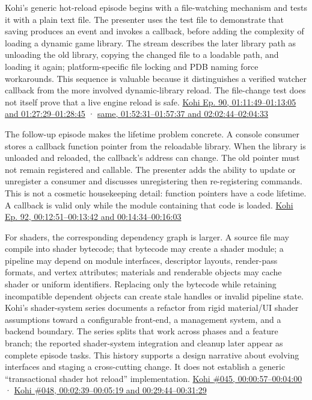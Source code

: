 Kohi's generic hot-reload episode begins with a file-watching mechanism and tests it with a plain text file. The presenter uses the test file to demonstrate that saving produces an event and invokes a callback, before adding the complexity of loading a dynamic game library. The stream describes the later library path as unloading the old library, copying the changed file to a loadable path, and loading it again; platform-specific file locking and PDB naming force workarounds. This sequence is valuable because it distinguishes a verified watcher callback from the more involved dynamic-library reload. The file-change test does not itself prove that a live engine reload is safe. \href{https://www.youtube.com/watch?v=SBG-qrT8wmg&t=1h11m49s}{Kohi Ep. 90, 01:11:49--01:13:05 and 01:27:29--01:28:45} · \href{https://www.youtube.com/watch?v=SBG-qrT8wmg&t=1h52m31s}{same, 01:52:31--01:57:37 and 02:02:44--02:04:33}

The follow-up episode makes the lifetime problem concrete. A console consumer stores a callback function pointer from the reloadable library. When the library is unloaded and reloaded, the callback's address can change. The old pointer must not remain registered and callable. The presenter adds the ability to update or unregister a consumer and discusses unregistering then re-registering commands. This is not a cosmetic housekeeping detail: function pointers have a code lifetime. A callback is valid only while the module containing that code is loaded. \href{https://www.youtube.com/watch?v=W-y6qSUOTw0&t=12m51s}{Kohi Ep. 92, 00:12:51--00:13:42 and 00:14:34--00:16:03}

For shaders, the corresponding dependency graph is larger. A source file may compile into shader bytecode; that bytecode may create a shader module; a pipeline may depend on module interfaces, descriptor layouts, render-pass formats, and vertex attributes; materials and renderable objects may cache shader or uniform identifiers. Replacing only the bytecode while retaining incompatible dependent objects can create stale handles or invalid pipeline state. Kohi's shader-system series documents a refactor from rigid material/UI shader assumptions toward a configurable front-end, a management system, and a backend boundary. The series splits that work across phases and a feature branch; the reported shader-system integration and cleanup later appear as complete episode tasks. This history supports a design narrative about evolving interfaces and staging a cross-cutting change. It does not establish a generic ``transactional shader hot reload'' implementation. \href{https://www.youtube.com/watch?v=wXLsGqck100&t=57s}{Kohi \#045, 00:00:57--00:04:00} · \href{https://www.youtube.com/watch?v=9nP3aBsrCXs&t=2m39s}{Kohi \#048, 00:02:39--00:05:19 and 00:29:44--00:31:29}


